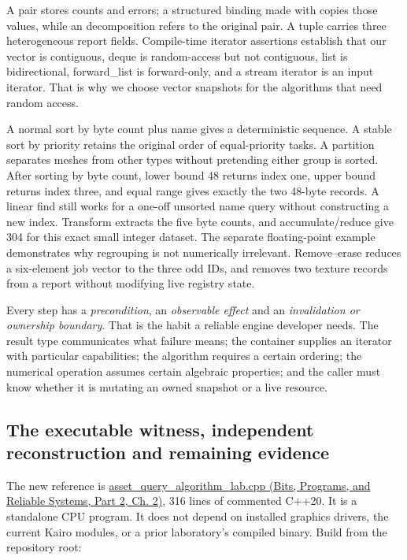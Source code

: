 A pair stores counts and errors; a structured binding made with  copies those values, while an  decomposition refers to the original pair. A tuple carries three heterogeneous report fields. Compile-time iterator assertions establish that our vector is contiguous, deque is random-access but not contiguous, list is bidirectional, forward\_list is forward-only, and a stream iterator is an input iterator. That is why we choose vector snapshots for the algorithms that need random access.

A normal sort by byte count plus name gives a deterministic sequence. A stable sort by priority retains the original order of equal-priority tasks. A partition separates meshes from other types without pretending either group is sorted. After sorting by byte count, lower bound 48 returns index one, upper bound returns index three, and equal range gives exactly the two 48-byte records. A linear find still works for a one-off unsorted name query without constructing a new index. Transform extracts the five byte counts, and accumulate/reduce give 304 for this exact small integer dataset. The separate floating-point example demonstrates why regrouping is not numerically irrelevant. Remove--erase reduces a six-element job vector to the three odd IDs, and  removes two texture records from a report without modifying live registry state.

Every step has a \emph{precondition}, an \emph{observable effect} and an \emph{invalidation or ownership boundary}. That is the habit a reliable engine developer needs. The result type communicates what failure means; the container supplies an iterator with particular capabilities; the algorithm requires a certain ordering; the numerical operation assumes certain algebraic properties; and the caller must know whether it is mutating an owned snapshot or a live resource.

\subsection{The executable witness, independent reconstruction and remaining evidence}\label{05-engine-i-ch006-the-executable-witness-independent-reconstruction-and-remaining-evidence}

\hypertarget{05-engine-i-ch006-the-executable-witness-independent-reconstruction-and-remaining-evidence}{}

The new reference is \href{../01-Bits-Programs-and-Reliable-Systems-P02/main.pdf\#nameddest=source-file-c479bd493444d093f6c34898}{asset\_query\_algorithm\_lab.cpp (Bits, Programs, and Reliable Systems, Part 2, Ch. 2)}, 316 lines of commented C++20. It is a standalone CPU program. It does not depend on installed graphics drivers, the current Kairo modules, or a prior laboratory's compiled binary. Build from the repository root:

